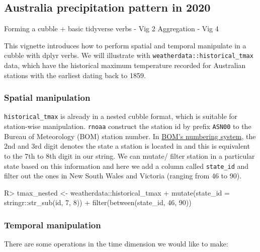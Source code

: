 \documentclass[
]{jss}
\begin{document}
\hypertarget{australia-precipitation-pattern-in-2020}{%
\subsection{Australia precipitation pattern in
2020}\label{australia-precipitation-pattern-in-2020}}

Forming a cubble + basic tidyverse verbs - Vig 2 Aggregation - Vig 4

This vignette introduces how to perform spatial and temporal manipulate
in a cubble with dplyr verbs. We will illustrate with
\texttt{weatherdata::historical\_tmax} data, which have the historical
maximum temperature recorded for Australian stations with the earliest
dating back to 1859.

\hypertarget{spatial-manipulation}{%
\subsubsection{Spatial manipulation}\label{spatial-manipulation}}

\texttt{historical\_tmax} is already in a nested cubble format, which is
suitable for station-wise manipulation. \texttt{rnoaa} construct the
station id by prefix \texttt{ASN00} to the Bureau of Meteorology (BOM)
station number. In
\href{http://www.bom.gov.au/climate/cdo/about/site-num.shtml}{BOM's
numbering system}, the 2nd and 3rd digit denotes the state a station is
located in and this is equivalent to the 7th to 8th digit in our string.
We can mutate/ filter station in a particular state based on this
information and here we add a column called \texttt{state\_id} and
filter out the ones in New South Wales and Victoria (ranging from 46 to
90).

\begin{CodeChunk}
\begin{CodeInput}
R> tmax_nested <- weatherdata::historical_tmax %
+   mutate(state_id = stringr::str_sub(id, 7, 8)) %
+   filter(between(state_id, 46, 90))
\end{CodeInput}
\end{CodeChunk}

\hypertarget{temporal-manipulation}{%
\subsubsection{Temporal manipulation}\label{temporal-manipulation}}

There are some operations in the time dimension we would like to make:
\end{document}
